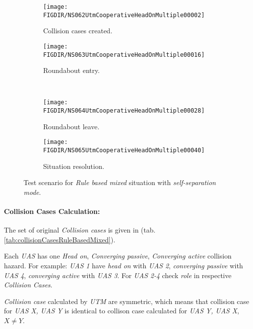     
    \begin{figure}[H]
        \centering
        \begin{subfigure}{0.48\textwidth}
        	\centering
            \texttt{[image: \\FIGDIR/NS062UtmCooperativeHeadOnMultiple00002]}
            \caption{Collision cases created.}
            \label{fig:ruleMultipleCollisionCasesCreated}
        \end{subfigure}
        \begin{subfigure}{0.48\textwidth}
        	\centering
            \texttt{[image: \\FIGDIR/NS063UtmCooperativeHeadOnMultiple00016]} 
            \caption{Roundabout entry.}
            \label{fig:ruleMultipleRoundabountEntry}
        \end{subfigure}
        \\
        \begin{subfigure}{0.48\textwidth}
        	\centering
            \texttt{[image: \\FIGDIR/NS064UtmCooperativeHeadOnMultiple00028]} 
            \caption{Roundabout leave.}
            \label{fig:ruleMultipleRoundaboutLeave}
        \end{subfigure}
        \begin{subfigure}{0.48\textwidth}
        	\centering
            \texttt{[image: \\FIGDIR/NS065UtmCooperativeHeadOnMultiple00040]} 
            \caption{Situation resolution.}
            \label{fig:ruleMultipleSituationResolution}
        \end{subfigure}
        \caption{Test scenario for \emph{Rule based mixed} situation with \emph{self-separation mode}.}
        \label{fig:testCaseRuleBasedMixed}
    \end{figure}
    
    \paragraph{Collision Cases Calculation:} The set of original \emph{Collision cases} is given in (tab. \ref{tab:collisionCasesRuleBasedMixed}). 
    
    Each \emph{UAS} has one \emph{Head on}, \emph{Converging passive}, \emph{Converging active} collision hazard. For example: \emph{UAS 1} have \emph{head on} with  \emph{UAS 2}, \emph{converging passive} with \emph{UAS 4}, \emph{converging active} with \emph{UAS 3}. For \emph{UAS 2-4} check \emph{role} in respective \emph{Collision Cases}.
    
    \begin{note} \emph{Collision case} calculated by \emph{UTM} are symmetric, which means that collision case for \emph{UAS X, UAS Y} is identical to collison case calculated for \emph{UAS Y, UAS X}, $X \neq Y$.
    \end{note}
    
